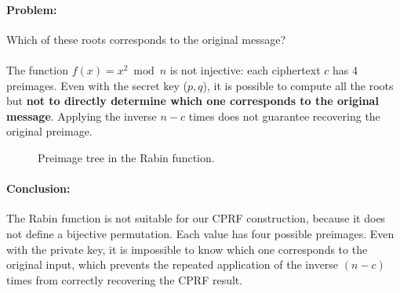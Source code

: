 \documentclass[9pt]{extarticle}
\begin{document}
\paragraph{Problem:} Which of these roots corresponds to the original message?

\paragraph{}
The function \(f(x) = x^2 \bmod n\) is not injective: each ciphertext \(c\) has 4 preimages.
Even with the secret key (\(p,q\)), it is possible to compute all the roots but \textbf{not to directly determine which one corresponds to the original message}.
Applying the inverse \(n-c\) times does not guarantee recovering the original preimage.

\begin{figure}[H]
  \centering
{}
\caption{Preimage tree in the Rabin function.}\label{fig:rabin-tree}
\end{figure}

\paragraph{Conclusion:}
The Rabin function is not suitable for our CPRF construction,
because it does not define a bijective permutation. Each value has four possible preimages.
Even with the private key, it is impossible to know which one corresponds to the original input, which prevents
the repeated application of the inverse $(n-c)$ times from correctly recovering the CPRF result.
\end{document}
